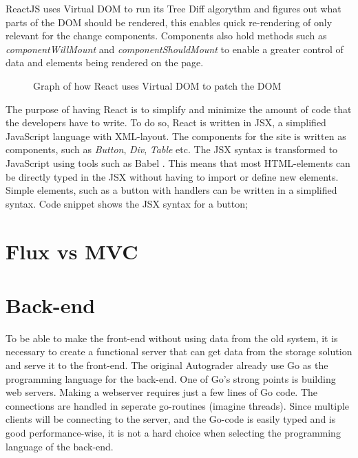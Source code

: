 ReactJS uses Virtual DOM to run its Tree Diff algorythm and figures out what parts of the DOM should be rendered, this enables quick re-rendering of only relevant for the change components. Components also hold methods such as \emph{componentWillMount} and \emph{componentShouldMount} to enable a greater control of data and elements being rendered on the page.

\begin{figure}[h]
\centering
{}
\caption{Graph of how React uses Virtual DOM to patch the DOM}
\end{figure}


The purpose of having React is to simplify and minimize the amount of code that the developers have to write. To do so, React is written in JSX, a simplified JavaScript language with XML-layout. The components for the site is written as components, such as \emph{Button}, \emph{Div}, \emph{Table} etc. The JSX syntax is transformed to JavaScript using tools such as Babel . This means that most HTML-elements can be directly typed in the JSX without having to import or define new elements. Simple elements, such as a button with handlers can be written in a simplified syntax. Code snippet  shows the JSX syntax for a button;



\section{Flux vs MVC}
\section{Back-end}
To be able to make the front-end without using data from the old system, it is necessary to create a functional server that can get data from the storage solution and serve it to the front-end. The original Autograder already use Go as the programming language for the back-end. One of Go's strong points is building web servers. Making a webserver requires just a few lines of Go code. The connections are handled in seperate go-routines (imagine threads). Since multiple clients will be connecting to the server, and the Go-code is easily typed and is good performance-wise, it is not a hard choice when selecting the programming language of the back-end. 

